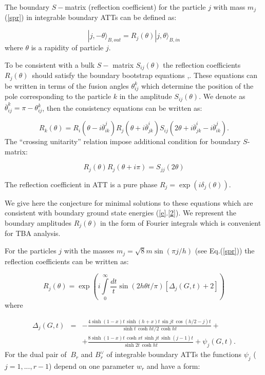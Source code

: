 \documentclass[a4paper,12pt,titlepage,final]{article}
\begin{document}
The boundary $S-$matrix (reflection coefficient) for the particle $j$ with
mass $m_{j}$ (\ref{spr}) in integrable boundary ATTs can be defined as:

\begin{equation}
|j,-\theta \rangle _{B,out}=R_{j}(\theta )|j,\theta \rangle _{B,in}
\label{BS}
\end{equation}
where $\theta $ is a rapidity of particle $j$.

To be consistent with a bulk $S-$ matrix $S_{ij}(\theta )$ the reflection
coefficients $R_{j}(\theta )$\ should satisfy the boundary bootstrap
equations \cite{FK},\cite{GZ}. These equations can be written in terms of
the fusion angles $\theta _{ij}^{k}$ which determine the position of the
pole corresponding to the particle $k$ in the amplitude $S_{ij}(\theta )$.
We denote as $\overline{\theta }_{ij}^{k}=\pi -\theta _{ij}^{k}$, then the
consistency equations can be written as:

\begin{equation}
R_{k}(\theta )=R_{i}(\theta -i\overline{\theta }_{ik}^{j})R_{j}(\theta +
i\overline{\theta }_{jk}^{i})S_{ij}(2\theta +i\overline{\theta }_{jk}^{i}-
i\overline{\theta }_{ik}^{j}).  \label{Bb}
\end{equation}
The ``crossing unitarity'' relation \cite{GZ} impose additional condition
for boundary $S$-matrix:

\begin{equation}
R_{j}(\theta )R_{j}(\theta +i\pi )=S_{jj}(2\theta )  \label{Cu}
\end{equation}

The reflection coefficient in ATT is a pure phase $R_{j}=\exp (i\delta
_{j}(\theta ))$.

We give here the conjecture for minimal solutions to these equations which
are consistent with boundary ground state energies (\ref{e}.\ref{2}). We
represent the boundary amplitudes $R_{j}(\theta )$ in the form of Fourier
integrals which is convenient for TBA analysis.

For the particles $j$ with the masses $m_{j}=\sqrt{8}m\sin (\pi j/h)$ (see
Eq.(\ref{spr})) the reflection coefficients can be written as:

\begin{equation}
R_{j}(\theta )=\exp \left( i\int\limits_{0}^{\infty }\frac{dt}{t}\sin \left(
2h\theta t/\pi \right) \left[ \Delta _{j}(G,t)+2\right] \right)  \label{del}
\end{equation}
where

\begin{eqnarray}
\Delta _{j}(G,t) &=&-\frac{4\sinh (1-x)t\,\sinh (h+x)t\,\sin jt\,\cos 
(h/2-j)t}
{\sinh t\,\cosh ht/2\,\cosh ht}+  \nonumber \\
&&+\frac{8\sinh (1-x)t\,\cosh xt\,\sinh jt\,\sinh (j-1)t}{\sinh 
2t\,\cosh ht}+
\psi_{j}(G,t).  \label{de}
\end{eqnarray}
For the dual pair of $\ B_{r}$ and $B_{r}^{\vee }$ of integrable boundary
ATTs the functions $\psi _{j}$ ($j=1,...,r-1$) depend on one parameter
$w_{r} $ and have a form:
\end{document}
